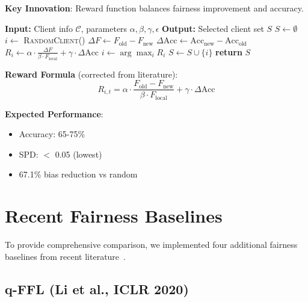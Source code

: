 \documentclass{article}
\begin{document}
\textbf{Key Innovation}: Reward function balances fairness improvement and accuracy.

\begin{algorithm}[H]
\caption{MAB Client Selection}
\begin{algorithmic}[1]
\State \textbf{Input:} Client info $\mathcal{C}$, parameters $\alpha, \beta, \gamma, \epsilon$
\State \textbf{Output:} Selected client set $S$
\State $S \leftarrow \emptyset$
     
        \State $i \leftarrow$ \textsc{RandomClient}()
    \Else {}
            \State $\Delta F \leftarrow F_{\text{old}} - F_{\text{new}}$ 
            \State $\Delta \text{Acc} \leftarrow \text{Acc}_{\text{new}} - \text{Acc}_{\text{old}}$
            \State $R_i \leftarrow \alpha \cdot \frac{\Delta F}{\beta \cdot F_{\text{local}}} + \gamma \cdot \Delta \text{Acc}$
        \EndFor
        \State $i \leftarrow \arg\max_i R_i$
    \EndIf
    \State $S \leftarrow S \cup \{i\}$
\EndFor
\State \textbf{return} $S$
\end{algorithmic}
\end{algorithm}

\textbf{Reward Formula} (corrected from literature):
\begin{equation}
R_{i,t} = \alpha \cdot \frac{F_{\text{old}} - F_{\text{new}}}{\beta \cdot F_{\text{local}}} + \gamma \cdot \Delta \text{Acc}
\end{equation}

\textbf{Expected Performance}:
\begin{itemize}
    \item Accuracy: 65-75\%
    \item SPD: $<$ 0.05 (lowest)
    \item 67.1\% bias reduction vs random
\end{itemize}

\section{Recent Fairness Baselines}

To provide comprehensive comparison, we implemented four additional fairness baselines from recent literature~\cite{li2020qffl,ezzeldin2021fedfair,mohri2019afl}.

\subsection{q-FFL (Li et al., ICLR 2020)}
\end{document}
